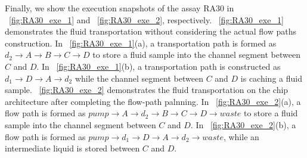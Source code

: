 
%

%

Finally, we show the execution snapshots of the assay RA30
in \figname~\ref{fig:RA30_exe_1} and \figname~\ref{fig:RA30_exe_2}, respectively.
\figname~\ref{fig:RA30_exe_1} demonstrates the fluid transportation without considering the actual flow paths construction. In \figname~\ref{fig:RA30_exe_1}(a), a transportation path is formed as $d_2\to A\to B \to C \to D $ to store a fluid sample into the channel segment between $C$ and $D$. In \figname~\ref{fig:RA30_exe_1}(b), a transportation path is constructed as $d_1\to D \to A \to d_2$ while the channel segment between $C$ and $D$ is caching a fluid sample.
\figname~\ref{fig:RA30_exe_2} demonstrates the fluid transportation on the chip architecture after completing the flow-path palnning. In \figname~\ref{fig:RA30_exe_2}(a), a flow path is
formed as $pump \to A \to d_2\to B \to C \to D\to waste$ to store a fluid sample
into the channel segment between $C$ and $D$. In \figname~\ref{fig:RA30_exe_2}(b), a flow path is formed as $pump
\to d_1 \to D \to A \to d_2 \to waste$, while an intermediate liquid is stored between $C$ and $D$.





